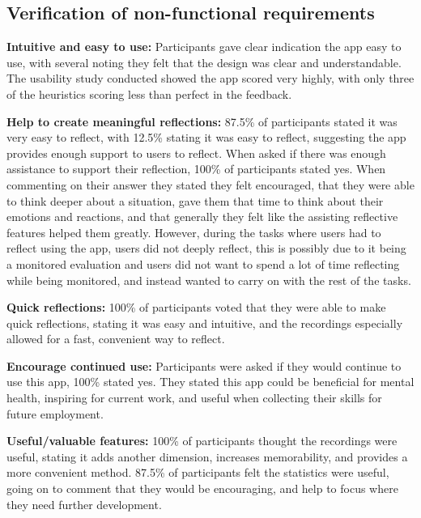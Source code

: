 \documentclass{l4proj}
\begin{document}



\subsection{Verification of non-functional requirements}

\textbf{Intuitive and easy to use:} Participants gave clear indication the app easy to use, with several noting they felt that the design was clear and understandable. The usability study conducted showed the app scored very highly, with only three of the heuristics scoring less than perfect in the feedback. 

\textbf{Help to create meaningful reflections:} 87.5\% of participants stated it was very easy to reflect, with 12.5\% stating it was easy to reflect, suggesting the app provides enough support to users to reflect. When asked if there was enough assistance to support their reflection, 100\% of participants stated yes. When commenting on their answer they stated they felt encouraged, that they were able to think deeper about a situation, gave them that time to think about their emotions and reactions, and that generally they felt like the assisting reflective features helped them greatly. However, during the tasks where users had to reflect using the app, users did not deeply reflect, this is possibly due to it being a monitored evaluation and users did not want to spend a lot of time reflecting while being monitored, and instead wanted to carry on with the rest of the tasks.

\textbf{Quick reflections:} 100\% of participants voted that they were able to make quick reflections, stating it was easy and intuitive, and the recordings especially allowed for a fast, convenient way to reflect.

\textbf{Encourage continued use:} Participants were asked if they would continue to use this app, 100\% stated yes. They stated this app could be beneficial for mental health, inspiring for current work, and useful when collecting their skills for future employment. 

\textbf{Useful/valuable features:} 100\% of participants thought the recordings were useful, stating it adds another dimension, increases memorability, and provides a more convenient method. 87.5\% of participants felt the statistics were useful, going on to comment that they would be encouraging, and help to focus where they need further development.
\end{document}
